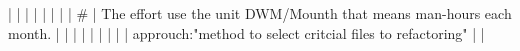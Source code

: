 |    |            |      |                                                                      |                                                                                                                                                                          |                                                                                                                                                                                                                                                            |                                                                                                                                                                                                                                                                      |  #                                                                                                                                                                                                                                                                                                       | The effort use the unit DWM/Mounth that means man-hours each month.                                                                                                                                                                                                                                                                                                                                                                                                                      |
|    |            |      |                                                                      |                                                                                                                                                                          |                                                                                                                                                                                                                                                            |                                                                                                                                                                                                                                                                      |  approuch:"method to select critcial files to refactoring"                                                                                                                                                                                                                                               |                                                                                                                                                                                                                                                                                                                                                                                                                                                                                              |
